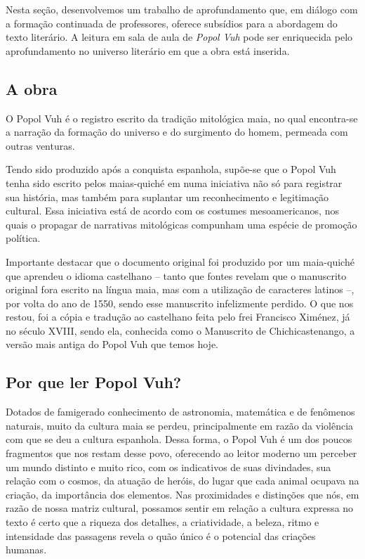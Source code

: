 \documentclass[12pt]{extarticle}
\begin{document}
Nesta seção, desenvolvemos um trabalho de aprofundamento que, em diálogo
com a formação continuada de professores, oferece subsídios para a
abordagem do texto literário. A leitura em sala de aula de \emph{Popol
Vuh} pode ser enriquecida pelo aprofundamento no universo literário em
que a obra está inserida.


\subsection{A obra}

O Popol Vuh é o registro escrito da tradição mitológica maia, no qual
encontra-se a narração da formação do universo e do surgimento do homem,
permeada com outras venturas.




Tendo sido produzido após a conquista espanhola, supõe-se que o Popol
Vuh tenha sido escrito pelos maias-quiché em numa iniciativa não só para
registrar sua história, mas também para suplantar um reconhecimento e
legitimação cultural. Essa iniciativa está de acordo com os costumes
mesoamericanos, nos quais o propagar de narrativas mitológicas compunham
uma espécie de promoção política.

Importante destacar que o documento original foi produzido por um
maia-quiché que aprendeu o idioma castelhano -- tanto que fontes revelam
que o manuscrito original fora escrito na língua maia, mas com a
utilização de caracteres latinos --, por volta do ano de 1550, sendo
esse manuscrito infelizmente perdido. O que nos restou, foi a cópia e
tradução ao castelhano feita pelo frei Francisco Ximénez, já no século
XVIII, sendo ela, conhecida como o Manuscrito de Chichicastenango, a
versão mais antiga do Popol Vuh que temos hoje.


 
 
\subsection{Por que ler Popol Vuh?}

Dotados de famigerado conhecimento de astronomia, matemática e de
fenômenos naturais, muito da cultura maia se perdeu, principalmente em
razão da violência com que se deu a cultura espanhola. Dessa forma, o
Popol Vuh é um dos poucos fragmentos que nos restam desse povo,
oferecendo ao leitor moderno um perceber um mundo distinto e muito rico,
com os indicativos de suas divindades, sua relação com o cosmos, da
atuação de heróis, do lugar que cada animal ocupava na criação, da
importância dos elementos. Nas proximidades e distinções que nós, em
razão de nossa matriz cultural, possamos sentir em relação a cultura
expressa no texto é certo que a riqueza dos detalhes, a criatividade, a
beleza, ritmo e intensidade das passagens revela o quão único é o
potencial das criações humanas.
\end{document}
